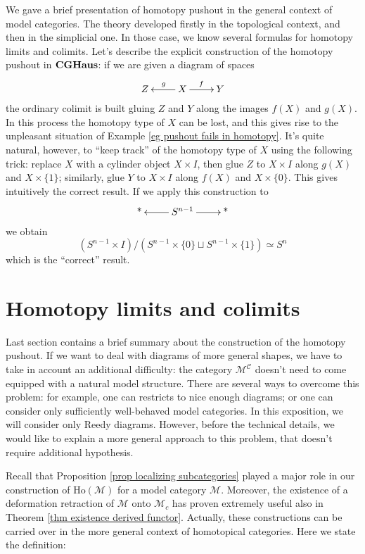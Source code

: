 \begin{refsection}
\begin{rmk}
We gave a brief presentation of homotopy pushout in the general context of model categories. The theory developed firstly in the topological context, and then in the simplicial one. In those case, we know several formulas for homotopy limits and colimits. Let's describe the explicit construction of the homotopy pushout in $\mathbf{CGHaus}$: if we are given a diagram of spaces
\[
\xymatrix{
Z & X \ar[l]_g \ar[r]^f & Y
}
\]
the ordinary colimit is built gluing $Z$ and $Y$ along the images $f(X)$ and $g(X)$. In this process the homotopy type of $X$ can be lost, and this gives rise to the unpleasant situation of Example \ref{eg pushout fails in homotopy}. It's quite natural, however, to ``keep track'' of the homotopy type of $X$ using the following trick: replace $X$ with a cylinder object $X \times I$, then glue $Z$ to $X \times I$ along $g(X)$ and $X \times \{1\}$; similarly, glue $Y$ to $X \times I$ along $f(X)$ and $X \times \{0\}$. This gives intuitively the correct result. If we apply this construction to
\[
\xymatrix{
\text{*} & S^{n-1} \ar[r] \ar[l] & \text{*}
}
\]
we obtain
\[
(S^{n-1} \times I) / (S^{n-1} \times \{0\} \sqcup S^{n-1} \times \{1\}) \simeq S^n
\]
which is the ``correct'' result.
\end{rmk}

\section{Homotopy limits and colimits} \label{homotopy limits}

Last section contains a brief summary about the construction of the homotopy pushout. If we want to deal with diagrams of more general shapes, we have to take in account an additional difficulty: the category $\mathcal M^{\mathcal C}$ doesn't need to come equipped with a natural model structure. There are several ways to overcome this problem: for example, one can restricts to nice enough diagrams; or one can consider only sufficiently well-behaved model categories. In this exposition, we will consider only Reedy diagrams. However, before the technical details, we would like to explain a more general approach to this problem, that doesn't require additional hypothesis.

Recall that Proposition \ref{prop localizing subcategories} played a major role in our construction of $\mathrm{Ho}(\mathcal M)$ for a model category $\mathcal M$. Moreover, the existence of a deformation retraction of $\mathcal M$ onto $\mathcal M_c$ has proven extremely useful also in Theorem \ref{thm existence derived functor}. Actually, these constructions can be carried over in the more general context of homotopical categories. Here we state the definition:


\end{refsection}
